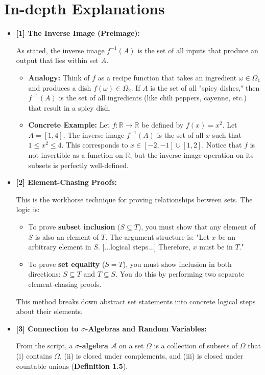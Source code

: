\documentclass[11pt,a4paper]{article}
\begin{document}
\newpage
\section*{In-depth Explanations}
\begin{itemize}
    \item \hypertarget{ref:inverse_image}{\textbf{[1] The Inverse Image (Preimage):}}
    As stated, the inverse image $f^{-1}(A)$ is the set of all inputs that produce an output that lies within set $A$.
    \begin{itemize}
        \item \textbf{Analogy:} Think of $f$ as a recipe function that takes an ingredient $\omega \in \Omega_1$ and produces a dish $f(\omega) \in \Omega_2$. If $A$ is the set of all "spicy dishes," then $f^{-1}(A)$ is the set of all ingredients (like chili peppers, cayenne, etc.) that result in a spicy dish.
        \item \textbf{Concrete Example:} Let $f: \mathbb{R} \to \mathbb{R}$ be defined by $f(x) = x^2$. Let $A = [1, 4]$. The inverse image $f^{-1}(A)$ is the set of all $x$ such that $1 \le x^2 \le 4$. This corresponds to $x \in [-2, -1] \cup [1, 2]$. Notice that $f$ is not invertible as a function on $\mathbb{R}$, but the inverse image operation on its subsets is perfectly well-defined.
    \end{itemize}

    \item \hypertarget{ref:element_chasing}{\textbf{[2] Element-Chasing Proofs:}}
    This is the workhorse technique for proving relationships between sets. The logic is:
    \begin{itemize}
        \item To prove \textbf{subset inclusion} ($S \subseteq T$), you must show that any element of $S$ is also an element of $T$. The argument structure is: "Let $x$ be an arbitrary element in $S$. [...logical steps...] Therefore, $x$ must be in $T$."
        \item To prove \textbf{set equality} ($S = T$), you must show inclusion in both directions: $S \subseteq T$ and $T \subseteq S$. You do this by performing two separate element-chasing proofs.
    \end{itemize}
    This method breaks down abstract set statements into concrete logical steps about their elements.

    \item \hypertarget{ref:sigma_algebra}{\textbf{[3] Connection to $\sigma$-Algebras and Random Variables:}}
    From the script, a \textbf{$\sigma$-algebra} $\mathcal{A}$ on a set $\Omega$ is a collection of subsets of $\Omega$ that (i) contains $\Omega$, (ii) is closed under complements, and (iii) is closed under countable unions (\textbf{Definition 1.5}).


\end{itemize}
\end{document}
